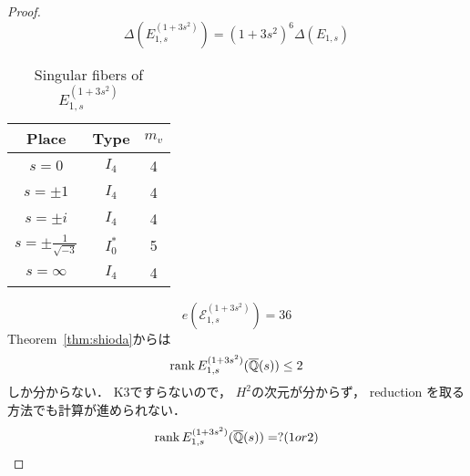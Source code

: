 \documentclass[main]{subfiles}
\begin{document}
\begin{proof}
    \begin{equation}
        \Delta(E_{1,s}^{(1 + 3s^{2})}) = (1 + 3s^{2})^{6} \Delta(E_{1,s})
    \end{equation}
    \begin{table}[h]
        \centering
        \caption{Singular fibers of $E_{1,s}^{(1 + 3s^{2})}$}
        \begin{tabular}{|c|c|c|}
            \hline
            Place                        & Type    & $m_v$ \\
            \hline
            $s=0$                        & $I_4$   & 4     \\
            $s=\pm 1$                    & $I_4$   & 4     \\
            $s=\pm i$                    & $I_4$   & 4     \\
            $s=\pm \frac{1}{\sqrt{-3}} $ & $I_0^*$ & 5     \\
            $s=\infty$                   & $I_4$   & 4     \\
            \hline
        \end{tabular}
    \end{table}
    \begin{equation}
        e(\mathcal{E}_{1,s}^{(1 + 3s^{2})}) = 36
    \end{equation}
    Theorem~\ref{thm:shioda}からは
    \begin{equation}
        \operatorname{rank} E_{1,s}^{(1 + 3s^{2})}(\overline{\mathbb{Q}}(s)) \leq 2
    \end{equation}
    しか分からない．
    K3ですらないので， $H^2$の次元が分からず， reduction を取る方法でも計算が進められない．
    \begin{equation}
        \operatorname{rank} E_{1,s}^{(1 + 3s^{2})}(\overline{\mathbb{Q}}(s)) = ? (1 or 2)
    \end{equation}
\end{proof}
\end{document}
